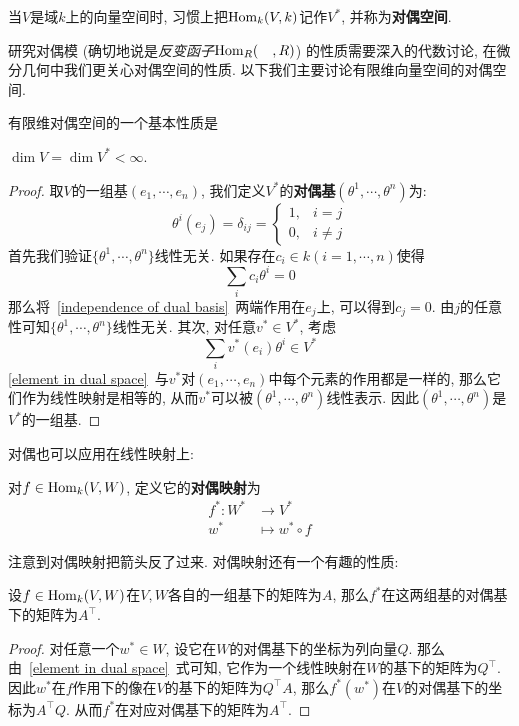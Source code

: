 \begin{sym}
    当$V$是域$k$上的向量空间时, 习惯上把$\operatorname{Hom}_k(V,k)$记作$V^*$, 并称为\textbf{对偶空间}.
\end{sym}

研究对偶模 (确切地说是\textit{反变函子}$\operatorname{Hom}_R(\quad,R)$) 的性质需要深入的代数讨论, 在微分几何中我们更关心对偶空间的性质.
以下我们主要讨论有限维向量空间的对偶空间.

有限维对偶空间的一个基本性质是
\begin{prop}\label{dim of dual space}
    $\dim V=\dim V^*<\infty$.
\end{prop}
\begin{proof}
    取$V$的一组基$(e_1,\cdots,e_n)$, 我们定义$V^*$的\textbf{对偶基}$(\theta^1,\cdots,\theta^n)$为:
    \[\theta^i(e_j)=\delta_{ij}=\begin{cases}
        1, & i=j\\
        0, & i\neq j
    \end{cases}\]
    首先我们验证$\{\theta^1,\cdots,\theta^n\}$线性无关.
    如果存在$c_i\in k(i=1,\cdots,n)$使得
    \begin{equation}
        \sum_ic_i\theta^i=0\label{independence of dual basis}
    \end{equation}
    那么将~\eqref{independence of dual basis}~两端作用在$e_j$上, 可以得到$c_j=0$.
    由$j$的任意性可知$\{\theta^1,\cdots,\theta^n\}$线性无关.
    其次, 对任意$v^*\in V^*$, 考虑
    \begin{equation}
        \sum_{i}v^*(e_i)\theta^i\in V^*\label{element in dual space}
    \end{equation}
    \eqref{element in dual space}~与$v^*$对$(e_1,\cdots,e_n)$中每个元素的作用都是一样的, 那么它们作为线性映射是相等的,
    从而$v^*$可以被$(\theta^1,\cdots,\theta^n)$线性表示.
    因此$(\theta^1,\cdots,\theta^n)$是$V^*$的一组基.
\end{proof}

对偶也可以应用在线性映射上:
\begin{defn}\label{dual map}
    对$f\in\operatorname{Hom}_k(V,W)$, 定义它的\textbf{对偶映射}为
    \begin{align*}
        f^*:W^*&\to V^*\\
        w^*&\mapsto w^*\circ f
    \end{align*}
\end{defn}
注意到对偶映射把箭头反了过来.
对偶映射还有一个有趣的性质:
\begin{prop}
    设$f\in\operatorname{Hom}_k(V,W)$在$V,W$各自的一组基下的矩阵为$A$, 那么$f^*$在这两组基的对偶基下的矩阵为$A^\top$.
\end{prop}
\begin{proof}
    对任意一个$w^*\in W$, 设它在$W$的对偶基下的坐标为列向量$Q$.
    那么由~\eqref{element in dual space}~式可知, 它作为一个线性映射在$W$的基下的矩阵为$Q^\top$.
    因此$w^*$在$f$作用下的像在$V$的基下的矩阵为$Q^\top A$, 那么$f^*(w^*)$在$V$的对偶基下的坐标为$A^\top Q$.
    从而$f^*$在对应对偶基下的矩阵为$A^\top$.
\end{proof}

